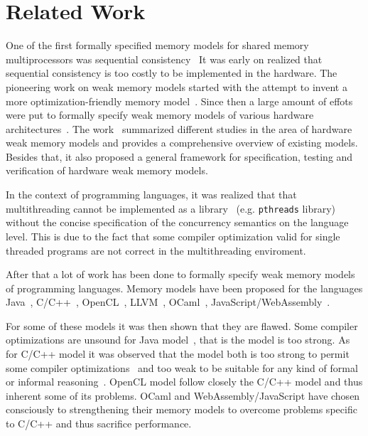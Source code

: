 \section{Related Work}

One of the first formally specified memory models 
for shared memory multiprocessors was sequential consistency~\cite{Lamport:TC79}
It was early on realized that sequential consistency 
is too costly to be implemented in the hardware. 
The pioneering work on weak memory models started with the attempt to 
invent a more optimization-friendly memory model~\cite{Adve:PhD93, Adve:Comp96}.
Since then a large amount of effots were put to formally specify weak memory models of various 
hardware architectures~\cite{Chong-ASPLOS08, Alglave-DAMP09, Sewell-al:CACM10, Sarkar-al:PLDI11, Flur-al:POPL16}.
The work~\cite{Alglave-al:TOPLAS14} summarized different studies in the area 
of hardware weak memory models and provides a comprehensive overview of existing models.  
Besides that, it also proposed a general framework for specification, 
testing and verification of hardware weak memory models.

In the context of programming languages, 
it was realized that that multithreading cannot
be implemented as a library~\cite{Boehm:ACM05} (e.g. \texttt{pthreads} library)
without the concise specification of the concurrency semantics on the language level.
This is due to the fact that some compiler optimization 
valid for single threaded programs are not correct in the multithreading enviroment.

After that a lot of work has been done to formally specify 
weak memory models of programming languages.
Memory models have been proposed for the languages
Java~\cite{Manson-al:POPL05}, 
C/C++~\cite{Boehm-Adve:PLDI08, Batty-al:POPL11}, 
OpenCL~\cite{Batty-el:POPL16}, LLVM~\cite{Chakraborty-Vafeiadis:CGO17}, 
OCaml~\cite{Dolan-al:PLDI18}, JavaScript/WebAssembly~\cite{Watt-el:OOPSLA19, Watt-el:PLDI2020}.

For some of these models it was then shown that they are flawed.
Some compiler optimizations are unsound for Java model~\cite{Sevcik-Aspinall:ECOOP08}, 
that is the model is too strong.
As for C/C++ model it was observed that the model both is too strong 
to permit some compiler optimizations~\cite{Vafeiadis-al:POPL15} and too weak to 
be suitable for any kind of formal or informal reasoning~\cite{Boehm-Demsky:MSPC14}. 
OpenCL model follow closely the C/C++ model and thus inherent some of its problems.
OCaml and WebAssembly/JavaScript have chosen consciously to strengthening their memory models
to overcome problems specific to C/C++ and thus sacrifice performance. 

